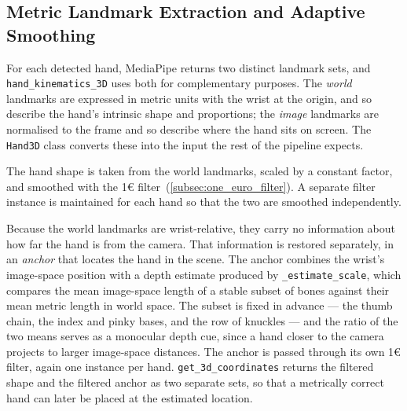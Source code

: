 \subsection{Metric Landmark Extraction and Adaptive Smoothing}\label{subsec:landmark_smoothing}

For each detected hand, MediaPipe returns two distinct landmark sets, and
\texttt{hand\_kinematics\_3D} uses both for complementary purposes. The
\emph{world} landmarks are expressed in metric units with the wrist at the
origin, and so describe the hand's intrinsic shape and proportions; the
\emph{image} landmarks are normalised to the frame and so describe where the hand
sits on screen. The \texttt{Hand3D} class converts these into the input the rest
of the pipeline expects.

The hand shape is taken from the world landmarks, scaled by a constant factor, and
smoothed with the 1\euro{} filter~(\autoref{subsec:one_euro_filter}). A separate filter
instance is maintained for each hand so that the two are smoothed independently.

Because the world landmarks are wrist-relative, they carry no information about how
far the hand is from the camera. That information is restored separately, in an
\emph{anchor} that locates the hand in the scene. The anchor combines the wrist's
image-space position with a depth estimate produced by \texttt{\_estimate\_scale},
which compares the mean image-space length of a stable subset of bones against
their mean metric length in world space. The subset is fixed in advance --- the
thumb chain, the index and pinky bases, and the row of knuckles --- and the ratio
of the two means serves as a monocular depth cue, since a hand closer to the camera
projects to larger image-space distances. The anchor is passed through its own
1\euro{} filter, again one instance per hand. \texttt{get\_3d\_coordinates}
returns the filtered shape and the filtered anchor as two separate sets, so that a
metrically correct hand can later be placed at the estimated location.
